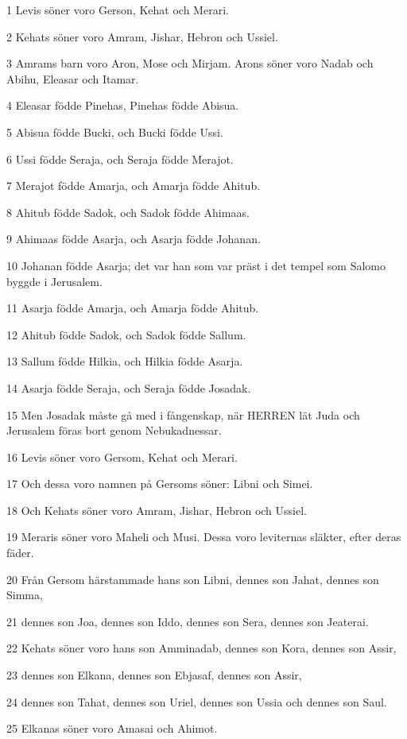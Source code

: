 \par 1 Levis söner voro Gerson, Kehat och Merari.
\par 2 Kehats söner voro Amram, Jishar, Hebron och Ussiel.
\par 3 Amrams barn voro Aron, Mose och Mirjam. Arons söner voro Nadab och Abihu, Eleasar och Itamar.
\par 4 Eleasar födde Pinehas, Pinehas födde Abisua.
\par 5 Abisua födde Bucki, och Bucki födde Ussi.
\par 6 Ussi födde Seraja, och Seraja födde Merajot.
\par 7 Merajot födde Amarja, och Amarja födde Ahitub.
\par 8 Ahitub födde Sadok, och Sadok födde Ahimaas.
\par 9 Ahimaas födde Asarja, och Asarja födde Johanan.
\par 10 Johanan födde Asarja; det var han som var präst i det tempel som Salomo byggde i Jerusalem.
\par 11 Asarja födde Amarja, och Amarja födde Ahitub.
\par 12 Ahitub födde Sadok, och Sadok födde Sallum.
\par 13 Sallum födde Hilkia, och Hilkia födde Asarja.
\par 14 Asarja födde Seraja, och Seraja födde Josadak.
\par 15 Men Josadak måste gå med i fångenskap, när HERREN lät Juda och Jerusalem föras bort genom Nebukadnessar.
\par 16 Levis söner voro Gersom, Kehat och Merari.
\par 17 Och dessa voro namnen på Gersoms söner: Libni och Simei.
\par 18 Och Kehats söner voro Amram, Jishar, Hebron och Ussiel.
\par 19 Meraris söner voro Maheli och Musi. Dessa voro leviternas släkter, efter deras fäder.
\par 20 Från Gersom härstammade hans son Libni, dennes son Jahat, dennes son Simma,
\par 21 dennes son Joa, dennes son Iddo, dennes son Sera, dennes son Jeaterai.
\par 22 Kehats söner voro hans son Amminadab, dennes son Kora, dennes son Assir,
\par 23 dennes son Elkana, dennes son Ebjasaf, dennes son Assir,
\par 24 dennes son Tahat, dennes son Uriel, dennes son Ussia och dennes son Saul.
\par 25 Elkanas söner voro Amasai och Ahimot.
